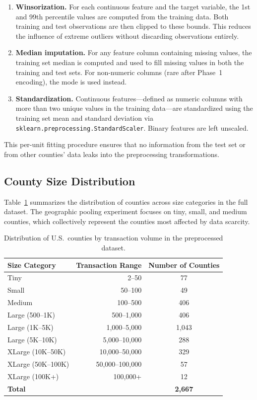 \begin{enumerate}
    \item \textbf{Winsorization.} For each continuous feature and the target variable, the 1st and 99th percentile values are computed from the training data. Both training and test observations are then clipped to these bounds. This reduces the influence of extreme outliers without discarding observations entirely.

    \item \textbf{Median imputation.} For any feature column containing missing values, the training set median is computed and used to fill missing values in both the training and test sets. For non-numeric columns (rare after Phase~1 encoding), the mode is used instead.

    \item \textbf{Standardization.} Continuous features---defined as numeric columns with more than two unique values in the training data---are standardized using the training set mean and standard deviation via \texttt{sklearn.preprocessing.StandardScaler}. Binary features are left unscaled.
\end{enumerate}

This per-unit fitting procedure ensures that no information from the test set or from other counties' data leaks into the preprocessing transformations.

\subsection{County Size Distribution}\label{app:county_sizes}

Table~\ref{tab:county_sizes} summarizes the distribution of counties across size categories in the full dataset. The geographic pooling experiment focuses on tiny, small, and medium counties, which collectively represent the counties most affected by data scarcity.

\begin{table}[ht]
\centering
\caption{Distribution of U.S.\ counties by transaction volume in the preprocessed dataset.}
\label{tab:county_sizes}
\begin{tabular}{lrc}
\toprule
\textbf{Size Category} & \textbf{Transaction Range} & \textbf{Number of Counties} \\
\midrule
Tiny       & 2--50        & 77 \\
Small      & 50--100      & 49 \\
Medium     & 100--500     & 406 \\
Large (500--1K)  & 500--1,000   & 406 \\
Large (1K--5K)   & 1,000--5,000  & 1,043 \\
Large (5K--10K)  & 5,000--10,000 & 288 \\
XLarge (10K--50K) & 10,000--50,000 & 329 \\
XLarge (50K--100K) & 50,000--100,000 & 57 \\
XLarge (100K+)   & 100,000+      & 12 \\
\midrule
\textbf{Total} &              & \textbf{2,667} \\
\bottomrule
\end{tabular}
\end{table}

